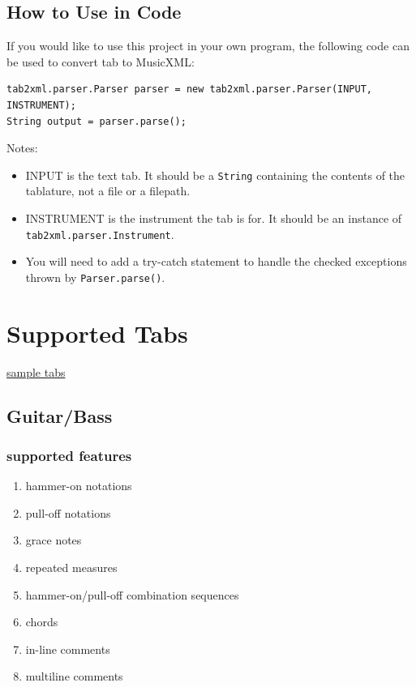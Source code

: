 \documentclass[11pt]{article}
\begin{document}
\subsection{How to Use in Code}
\label{sec:org6c2efdc}
If you would like to use this project in your own program, the following code can be used to convert tab to MusicXML:

\begin{verbatim}
tab2xml.parser.Parser parser = new tab2xml.parser.Parser(INPUT, INSTRUMENT);  
String output = parser.parse();  
\end{verbatim}

Notes:
\begin{itemize}
\item INPUT is the text tab.  It should be a \texttt{String} containing the contents of the tablature, not a file or a filepath.
\item INSTRUMENT is the instrument the tab is for.  It should be an instance of \texttt{tab2xml.parser.Instrument}.
\item You will need to add a try-catch statement to handle the checked exceptions thrown by \texttt{Parser.parse()}.
\end{itemize}

\section{Supported Tabs}
\label{sec:org5280458}
\href{https://github.com/ahopk127/eecs2311-tab2xml/tree/develop/src/test/resources}{sample tabs}
\subsection{Guitar/Bass}
\label{sec:org290e2ad}
\subsubsection{supported features}
\label{sec:orgdf7d811}
\begin{enumerate}
\item hammer-on notations
\item pull-off notations
\item grace notes
\item repeated measures
\item hammer-on/pull-off combination sequences
\item chords
\item in-line comments
\item multiline comments
\end{enumerate}
\end{document}
